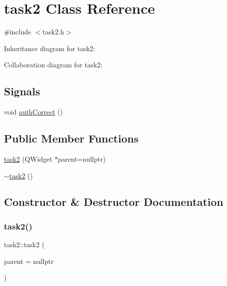 \hypertarget{classtask2}{}\section{task2 Class Reference}
\label{classtask2}


{\ttfamily \#include $<$task2.\+h$>$}



Inheritance diagram for task2\+:


Collaboration diagram for task2\+:
\subsection*{Signals}
\begin{DoxyCompactItemize}
\item 
void \mbox{\hyperlink{classtask2_ae1300135e91036758449e9d3ad21461d}{auth\+Correct}} ()
\end{DoxyCompactItemize}
\subsection*{Public Member Functions}
\begin{DoxyCompactItemize}
\item 
\mbox{\hyperlink{classtask2_a5c180fcef91e07c93fa45c95e26567ef}{task2}} (Q\+Widget $\ast$parent=nullptr)
\item 
\mbox{\hyperlink{classtask2_a556f5667a380cc0341cd8e585411849a}{$\sim$task2}} ()
\end{DoxyCompactItemize}


\subsection{Constructor \& Destructor Documentation}
\mbox{\label{classtask2_a5c180fcef91e07c93fa45c95e26567ef}} 
\subsubsection{\texorpdfstring{task2()}{task2()}}
{\footnotesize\ttfamily task2\+::task2 (\begin{DoxyParamCaption}\item[{Q\+Widget $\ast$}]{parent = {\ttfamily nullptr} }\end{DoxyParamCaption})\hspace{0.3cm}{\ttfamily [explicit]}}

